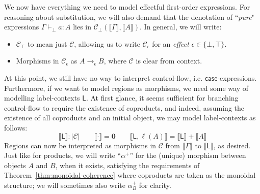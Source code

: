 \documentclass[acmsmall,screen,review]{acmart}
\newcommand{\mc}[1]{\ensuremath{\mathcal{#1}}}
\newcommand{\mb}[1]{\ensuremath{\mathbf{#1}}}
\newcommand{\ms}[1]{\ensuremath{\mathsf{#1}}}
\newcommand{\lhyp}[2]{#1(#2)}
\newcommand{\hasty}[4]{#1 \vdash_{#2} #3: {#4}}
\newcommand{\dnt}[1]{\llbracket{#1}\rrbracket}
\begin{document}
We now have everything we need to model effectful first-order expressions. For reasoning about
substitution, we will also demand that the denotation of ``\emph{pure}" expressions
$\hasty{\Gamma}{\bot}{a}{A}$ lies in $\mc{C}_\bot(\dnt{\Gamma}, \dnt{A})$. In general, we will
write:
\begin{itemize}
  \item $\mc{C}_\top$ to mean just $\mc{C}$, allowing us to write $\mc{C}_\epsilon$ for an
  \emph{effect} $\epsilon \in \{\bot, \top\}$.
  \item Morphisms in $\mc{C}_\epsilon$ as $A \to_\epsilon B$, where $\mc{C}$ is clear from context.
\end{itemize} 

At this point, we still have no way to interpret control-flow, i.e. $\ms{case}$-expressions.
Furthermore, if we want to model regions as morphisms, we need some way of modelling label-contexts
$\ms{L}$. At first glance, it seems sufficient for branching control-flow to require the existence
of coproducts, and indeed, assuming the existence of all coproducts and an initial object, we may
model label-contexts as follows:
$$
\boxed{\dnt{\ms{L}} : |\mc{C}|} \qquad 
  \dnt{\cdot} = \mb{0} \qquad \dnt{\ms{L}, \lhyp{\ell}{A}} = \dnt{\ms{L}} + \dnt{A}
$$
Regions can now be interpreted as morphisms in $\mc{C}$ from $\dnt{\Gamma}$ to $\dnt{\ms{L}}$, as
desired. Just like for products, we will write ``$\alpha^+$'' for the (unique) morphism between
objects $A$ and $B$, when it exists, satisfying the requirements of
Theorem~\ref{thm:monoidal-coherence} where coproducts are taken as the monoidal structure; we will
sometimes also write $\alpha^+_B$ for clarity.
\end{document}
